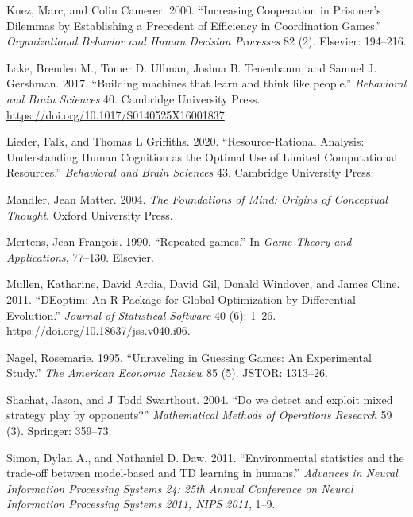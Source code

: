 \documentclass[smallextended]{svjour3}       %
\begin{document}
\leavevmode\hypertarget{ref-knez2000increasing}{}%
Knez, Marc, and Colin Camerer. 2000. ``Increasing Cooperation in
Prisoner's Dilemmas by Establishing a Precedent of Efficiency in
Coordination Games.'' \emph{Organizational Behavior and Human Decision
Processes} 82 (2). Elsevier: 194--216.

\leavevmode\hypertarget{ref-Lake2017}{}%
Lake, Brenden M., Tomer D. Ullman, Joshua B. Tenenbaum, and Samuel J.
Gershman. 2017. ``Building machines that learn and think like people.''
\emph{Behavioral and Brain Sciences} 40. Cambridge University Press.
\url{https://doi.org/10.1017/S0140525X16001837}.

\leavevmode\hypertarget{ref-lieder2020resource}{}%
Lieder, Falk, and Thomas L Griffiths. 2020. ``Resource-Rational
Analysis: Understanding Human Cognition as the Optimal Use of Limited
Computational Resources.'' \emph{Behavioral and Brain Sciences} 43.
Cambridge University Press.

\leavevmode\hypertarget{ref-mandler2004foundations}{}%
Mandler, Jean Matter. 2004. \emph{The Foundations of Mind: Origins of
Conceptual Thought}. Oxford University Press.

\leavevmode\hypertarget{ref-mertens1990repeated}{}%
Mertens, Jean-François. 1990. ``Repeated games.'' In \emph{Game Theory
and Applications}, 77--130. Elsevier.

\leavevmode\hypertarget{ref-R-DEoptim}{}%
Mullen, Katharine, David Ardia, David Gil, Donald Windover, and James
Cline. 2011. ``DEoptim: An R Package for Global Optimization by
Differential Evolution.'' \emph{Journal of Statistical Software} 40 (6):
1--26. \url{https://doi.org/10.18637/jss.v040.i06}.

\leavevmode\hypertarget{ref-nagel1995unraveling}{}%
Nagel, Rosemarie. 1995. ``Unraveling in Guessing Games: An Experimental
Study.'' \emph{The American Economic Review} 85 (5). JSTOR: 1313--26.

\leavevmode\hypertarget{ref-shachat2004we}{}%
Shachat, Jason, and J Todd Swarthout. 2004. ``Do we detect and exploit
mixed strategy play by opponents?'' \emph{Mathematical Methods of
Operations Research} 59 (3). Springer: 359--73.

\leavevmode\hypertarget{ref-Simon_Daw_11}{}%
Simon, Dylan A., and Nathaniel D. Daw. 2011. ``Environmental statistics
and the trade-off between model-based and TD learning in humans.''
\emph{Advances in Neural Information Processing Systems 24: 25th Annual
Conference on Neural Information Processing Systems 2011, NIPS 2011},
1--9.
\end{document}
